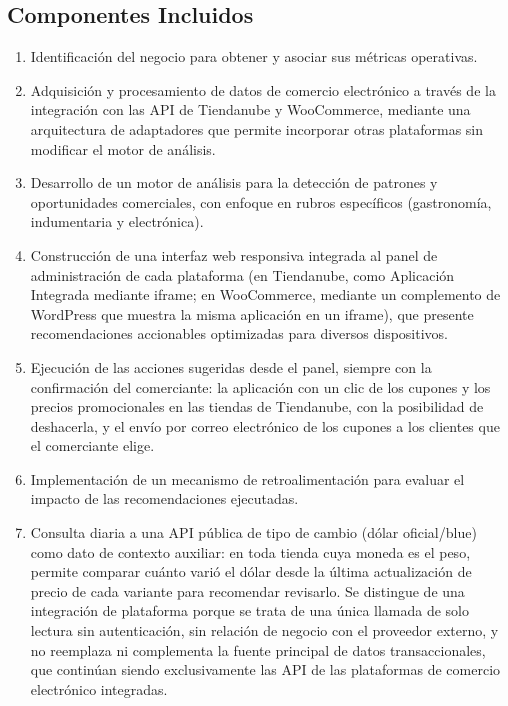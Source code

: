 \subsection{Componentes Incluidos}
\label{sec:componentes-incluidos}

\begin{enumerate}
    \item Identificación del negocio para obtener y asociar sus métricas operativas.

    \item Adquisición y procesamiento de datos de comercio electrónico a través de la integración con las API de Tiendanube y WooCommerce, mediante una arquitectura de adaptadores que permite incorporar otras plataformas sin modificar el motor de análisis.

    \item Desarrollo de un motor de análisis para la detección de patrones y oportunidades comerciales, con enfoque en rubros específicos (gastronomía, indumentaria y electrónica).

    \item Construcción de una interfaz web responsiva integrada al panel de administración de cada plataforma (en Tiendanube, como Aplicación Integrada mediante iframe; en WooCommerce, mediante un complemento de WordPress que muestra la misma aplicación en un iframe), que presente recomendaciones accionables optimizadas para diversos dispositivos.

    \item Ejecución de las acciones sugeridas desde el panel, siempre con la confirmación del comerciante: la aplicación con un clic de los cupones y los precios promocionales en las tiendas de Tiendanube, con la posibilidad de deshacerla, y el envío por correo electrónico de los cupones a los clientes que el comerciante elige.

    \item Implementación de un mecanismo de retroalimentación para evaluar el impacto de las recomendaciones ejecutadas.

    \item Consulta diaria a una API pública de tipo de cambio (dólar oficial/blue) como dato de contexto auxiliar: en toda tienda cuya moneda es el peso, permite comparar cuánto varió el dólar desde la última actualización de precio de cada variante para recomendar revisarlo. Se distingue de una integración de plataforma porque se trata de una única llamada de solo lectura sin autenticación, sin relación de negocio con el proveedor externo, y no reemplaza ni complementa la fuente principal de datos transaccionales, que continúan siendo exclusivamente las API de las plataformas de comercio electrónico integradas.
\end{enumerate}

